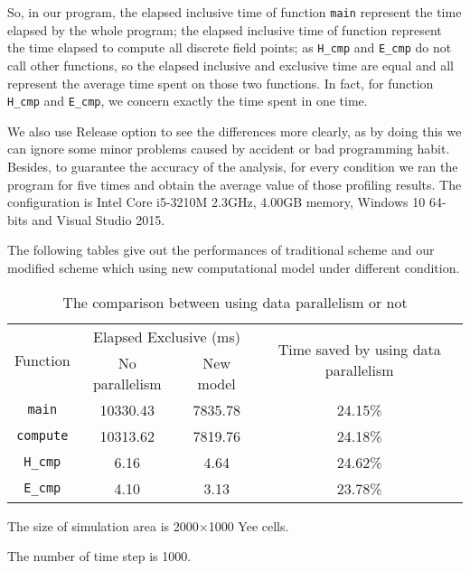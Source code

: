 So, in our program, the elapsed inclusive time of function \lstinline|main| represent the time elapsed by the whole program; the elapsed inclusive time of function  represent the time elapsed to compute all discrete field points; as \lstinline|H_cmp| and \lstinline|E_cmp| do not call other functions, so the elapsed inclusive and exclusive time are equal and all represent the average time spent on those two functions. In fact, for function \lstinline|H_cmp| and \lstinline|E_cmp|, we concern exactly the time spent in one time.

We also use Release option to see the differences more clearly, as by doing this we can ignore some minor problems caused by accident or bad programming habit. Besides, to guarantee the accuracy of the analysis, for every condition we ran the program for five times and obtain the average value of those profiling results. The configuration is Intel Core i5-3210M 2.3GHz, 4.00GB memory, Windows 10 64-bits and Visual Studio 2015.

The following tables give out the performances of traditional scheme and our modified scheme which using new computational model under different condition.

\begin{table}[hp]
\centering
\begin{threeparttable}
	\caption{The comparison between using data parallelism or not}\label{ch3: data parallel or not}
	\begin{tabular}{cccc}
		\toprule
		\multirow{2}{3em}{Function}&\multicolumn{2}{c}{Elapsed Exclusive (ms)} & \multirow{2}{15em}{Time saved by using data parallelism}\\
		\cline{2-3}
		& No parallelism & New model & \\ 
		
		\midrule
		\lstinline|main| & 10330.43 & 7835.78 & 24.15\% \\ 
		\lstinline|compute| & 10313.62 & 7819.76 & 24.18\%\\ 
		\lstinline|H_cmp|& 6.16 & 4.64 & 24.62\%\\ 
		\lstinline|E_cmp|& 4.10 & 3.13 &23.78\% \\
		\bottomrule
	\end{tabular} 
	\begin{tablenotes}
		\item[1] The size of simulation area is 2000$\times$1000 Yee cells.
		\item[2] The number of time step is 1000.
	\end{tablenotes}
\end{threeparttable}
\end{table}

